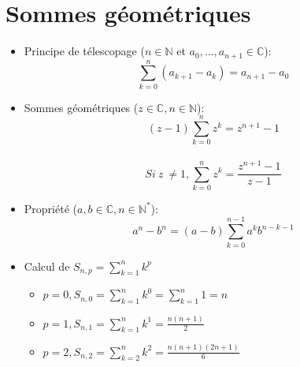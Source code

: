 \documentclass{article}
\begin{document}
\section{Sommes g\'{e}om\'{e}triques}
\begin{itemize}
	\item Principe de t\'{e}lescopage (\(n \in \mathbb{N}\) et \(a_0, \hdots, a_{n+1} \in \mathbb{C}\)): \\
	\[\sum_{k=0}^{n} (a_{k+1} - a_k) = a_{n+1} - a_0\]
	\item Sommes g\'{e}om\'{e}triques (\(z \in \mathbb{C}, n \in \mathbb{N}\)):
	\[(z-1)\sum_{k=0}^{n}z^k = z^{n+1} -1\] \\
	\[Si\ z\ \neq 1, \sum_{k=0}^{n}z^k=\frac{z^{n+1}-1}{z-1}\]
	\item Propri\'{e}t\'{e} (\(a,b \in \mathbb{C}, n \in \mathbb{N}^*\)): \\
	\[a^n-b^n = (a-b)\sum_{k=0}^{n-1}a^kb^{n-k-1}\]
	\item Calcul de \(S_{n,p} = \sum_{k=1}^{n}k^p\) \\
	\begin{itemize}
		\item \(p = 0, S_{n,0} = \sum_{k=1}^{n}k^0 = \sum_{k=1}^{n}1 = n\) \\
		\item \(p = 1, S_{n,1} = \sum_{k=1}^{n}k^1 = \frac{n(n+1)}{2} \) \\
		\item \(p = 2, S_{n,2} = \sum_{k=2}^{n}k^2 = \frac{n(n+1)(2n+1)}{6} \) \\
	\end{itemize}


\end{itemize}
\end{document}
